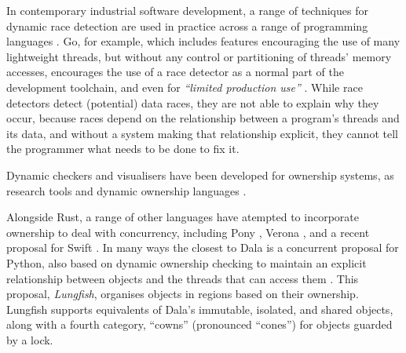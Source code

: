 In contemporary industrial software development, a range of techniques
for dynamic race detection are used in practice across a range of
programming languages
\cite{hong2015survey,o2003hybrid,cai2021sound,TSanRV2011,DBLP:conf/rv/EricksonFM12}.  Go, for
example, which includes features
encouraging the use of many lightweight threads, but without any control
or partitioning of threads' memory accesses,  encourages the use
of a race detector as a normal part of the development toolchain, and
even for \textit{``limited production use''}
\cite{GoCACM2022,TSanRV2011}.
%
While race detectors detect (potential) data races, they are not
able to explain why they occur, because races depend on the
relationship between a program's threads and its data, and without
a system making that relationship explicit, they cannot tell the
programmer what needs to be done to fix it.


Dynamic checkers and visualisers have been developed for ownership
systems, as research tools \cite{hill:2002:jvlc,MitchellECOOP2009} and
dynamic ownership languages \cite{dynamicOwn,dynamicAlias}.

Alongside Rust, a range of other languages have atempted to
incorporate ownership to deal with concurrency, including Pony
\cite{Pony}, Verona \cite{VeronaMemory2023,VeronaConcur2023}, and a
recent proposal for Swift \cite{gallifrey-pldi2022}. In many ways the
closest to Dala is a concurrent proposal for Python, also based on
dynamic ownership checking to maintain an explicit relationship
between objects and the threads that can access them
\cite{pyrona2025}. This proposal, \textit{Lungfish}, organises objects
in regions based on their ownership. Lungfish supports equivalents of
Dala's immutable, isolated, and shared objects, along with a fourth
category, ``cowns'' (pronounced ``cones'') for objects guarded by a
lock.


